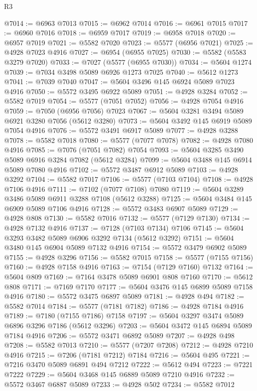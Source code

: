 \begin{lexlean}{R3}
\begin{coremodule}
@7014 := @6963 @7013
@7015 := @6962 @7014
@7016 := @6961 @7015
@7017 := @6960 @7016
@7018 := @6959 @7017
@7019 := @6958 @7018
@7020 := @6957 @7019
@7021 := @5582 @7020
@7023 := @5577 (@6956 @7021)
@7025 := @4928 @7023 @4916
@7027 := @6954 (@6955 @7025)
@7030 := @5582 (@5583 @3279 @7020)
@7033 := @7027 (@5577 (@6955 @7030))
@7034 := @5604 @1274
@7039 := @7034 @3498 @5089 @6926 @1273 @7025
@7040 := @5612 @1273
@7041 := @7039 @7040
@7047 := @5604 @3496 @145 @6924 @5089 @7023 @4916
@7050 := @5572 @3495 @6922 @5089
@7051 := @4928 @3284
@7052 := @5582 @7019
@7054 := @5577 (@7051 @7052)
@7056 := @4928 @7054 @4916
@7059 := @7050 (@6956 @7056) @7023
@7067 := @5604 @3281 @3494 @5089 @6921 @3280 @7056 (@5612 @3280)
@7073 := @5604 @3492 @145 @6919 @5089 @7054 @4916
@7076 := @5572 @3491 @6917 @5089
@7077 := @4928 @3288
@7078 := @5582 @7018
@7080 := @5577 (@7077 @7078)
@7082 := @4928 @7080 @4916
@7085 := @7076 (@7051 @7082) @7054
@7093 := @5604 @3285 @3490 @5089 @6916 @3284 @7082 (@5612 @3284)
@7099 := @5604 @3488 @145 @6914 @5089 @7080 @4916
@7102 := @5572 @3487 @6912 @5089
@7103 := @4928 @3292
@7104 := @5582 @7017
@7106 := @5577 (@7103 @7104)
@7108 := @4928 @7106 @4916
@7111 := @7102 (@7077 @7108) @7080
@7119 := @5604 @3289 @3486 @5089 @6911 @3288 @7108 (@5612 @3288)
@7125 := @5604 @3484 @145 @6909 @5089 @7106 @4916
@7128 := @5572 @3483 @6907 @5089
@7129 := @4928 @808
@7130 := @5582 @7016
@7132 := @5577 (@7129 @7130)
@7134 := @4928 @7132 @4916
@7137 := @7128 (@7103 @7134) @7106
@7145 := @5604 @3293 @3482 @5089 @6906 @3292 @7134 (@5612 @3292)
@7151 := @5604 @3480 @145 @6904 @5089 @7132 @4916
@7154 := @5572 @3479 @6902 @5089
@7155 := @4928 @3296
@7156 := @5582 @7015
@7158 := @5577 (@7155 @7156)
@7160 := @4928 @7158 @4916
@7163 := @7154 (@7129 @7160) @7132
@7164 := @5604 @809
@7169 := @7164 @3478 @5089 @6901 @808 @7160
@7170 := @5612 @808
@7171 := @7169 @7170
@7177 := @5604 @3476 @145 @6899 @5089 @7158 @4916
@7180 := @5572 @3475 @6897 @5089
@7181 := @4928 @494
@7182 := @5582 @7014
@7184 := @5577 (@7181 @7182)
@7186 := @4928 @7184 @4916
@7189 := @7180 (@7155 @7186) @7158
@7197 := @5604 @3297 @3474 @5089 @6896 @3296 @7186 (@5612 @3296)
@7203 := @5604 @3472 @145 @6894 @5089 @7184 @4916
@7206 := @5572 @3471 @6892 @5089
@7207 := @4928 @498
@7208 := @5582 @7013
@7210 := @5577 (@7207 @7208)
@7212 := @4928 @7210 @4916
@7215 := @7206 (@7181 @7212) @7184
@7216 := @5604 @495
@7221 := @7216 @3470 @5089 @6891 @494 @7212
@7222 := @5612 @494
@7223 := @7221 @7222
@7229 := @5604 @3468 @145 @6889 @5089 @7210 @4916
@7232 := @5572 @3467 @6887 @5089
@7233 := @4928 @502
@7234 := @5582 @7012

\end{coremodule}
\end{lexlean}
